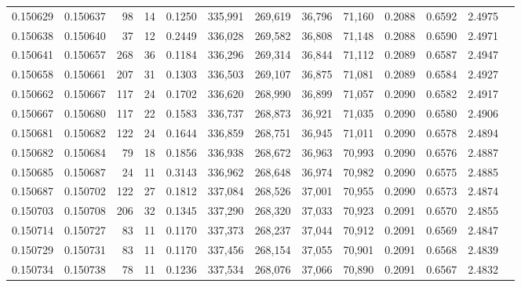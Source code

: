 \begin{tabular}{rrrrrrrrrrrrr}
0.150629 & 0.150637 &    98 &  14 &                                     0.1250 & 335,991 & 269,619 &  36,796 &  71,160 & 0.2088 & 0.6592 & 2.4975 \\
0.150638 & 0.150640 &    37 &  12 &                                     0.2449 & 336,028 & 269,582 &  36,808 &  71,148 & 0.2088 & 0.6590 & 2.4971 \\
0.150641 & 0.150657 &   268 &  36 &                                     0.1184 & 336,296 & 269,314 &  36,844 &  71,112 & 0.2089 & 0.6587 & 2.4947 \\
0.150658 & 0.150661 &   207 &  31 &                                     0.1303 & 336,503 & 269,107 &  36,875 &  71,081 & 0.2089 & 0.6584 & 2.4927 \\
0.150662 & 0.150667 &   117 &  24 &                                     0.1702 & 336,620 & 268,990 &  36,899 &  71,057 & 0.2090 & 0.6582 & 2.4917 \\
0.150667 & 0.150680 &   117 &  22 &                                     0.1583 & 336,737 & 268,873 &  36,921 &  71,035 & 0.2090 & 0.6580 & 2.4906 \\
0.150681 & 0.150682 &   122 &  24 &                                     0.1644 & 336,859 & 268,751 &  36,945 &  71,011 & 0.2090 & 0.6578 & 2.4894 \\
0.150682 & 0.150684 &    79 &  18 &                                     0.1856 & 336,938 & 268,672 &  36,963 &  70,993 & 0.2090 & 0.6576 & 2.4887 \\
0.150685 & 0.150687 &    24 &  11 &                                     0.3143 & 336,962 & 268,648 &  36,974 &  70,982 & 0.2090 & 0.6575 & 2.4885 \\
0.150687 & 0.150702 &   122 &  27 &                                     0.1812 & 337,084 & 268,526 &  37,001 &  70,955 & 0.2090 & 0.6573 & 2.4874 \\
0.150703 & 0.150708 &   206 &  32 &                                     0.1345 & 337,290 & 268,320 &  37,033 &  70,923 & 0.2091 & 0.6570 & 2.4855 \\
0.150714 & 0.150727 &    83 &  11 &                                     0.1170 & 337,373 & 268,237 &  37,044 &  70,912 & 0.2091 & 0.6569 & 2.4847 \\
0.150729 & 0.150731 &    83 &  11 &                                     0.1170 & 337,456 & 268,154 &  37,055 &  70,901 & 0.2091 & 0.6568 & 2.4839 \\
0.150734 & 0.150738 &    78 &  11 &                                     0.1236 & 337,534 & 268,076 &  37,066 &  70,890 & 0.2091 & 0.6567 & 2.4832 \\

\end{tabular}
